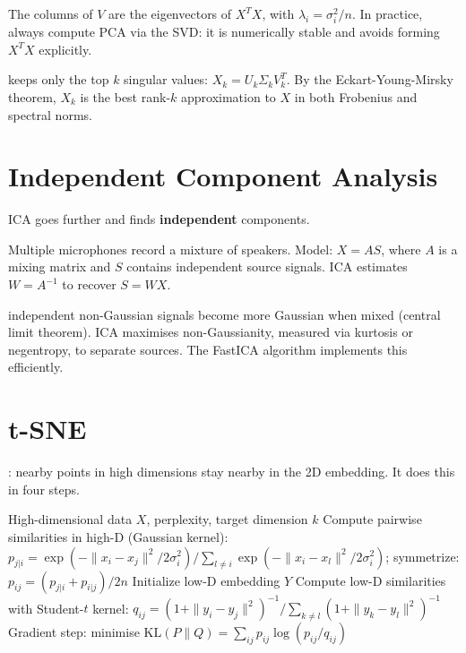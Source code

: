  The columns of $V$ are the eigenvectors of $X^T X$, with $\lambda_i = \sigma_i^2 / n$.
In practice, always compute PCA via the SVD: it is numerically stable and avoids forming $X^T X$ explicitly.

 keeps only the top $k$ singular values: $X_k = U_k \Sigma_k V_k^T$.
By the Eckart-Young-Mirsky theorem, $X_k$ is the best rank-$k$ approximation to $X$ in both Frobenius and spectral norms.


\section{Independent Component Analysis}


ICA goes further and finds \textbf{independent} components.

 Multiple microphones record a mixture of speakers.
Model: $X = AS$, where $A$ is a mixing matrix and $S$ contains independent source signals.
ICA estimates $W{=}A^{-1}$ to recover $S{=}WX$.

 independent non-Gaussian signals become more Gaussian when mixed (central limit theorem).
ICA maximises non-Gaussianity, measured via kurtosis or negentropy, to separate sources.
The FastICA algorithm implements this efficiently.


\section{t-SNE}


: nearby points in high dimensions stay nearby in the 2D embedding.
It does this in four steps.

\begin{algorithm}[H]
\caption{t-SNE}
\begin{algorithmic}[1]
\Require High-dimensional data $X$, perplexity, target dimension $k$
\State Compute pairwise similarities in high-D (Gaussian kernel): $p_{j|i} = \exp(-\|x_i - x_j\|^2 / 2\sigma_i^2) / \sum_{l \neq i} \exp(-\|x_i - x_l\|^2 / 2\sigma_i^2)$; symmetrize: $p_{ij} = (p_{j|i} + p_{i|j}) / 2n$
\State Initialize low-D embedding $Y$
\Repeat
    \State Compute low-D similarities with Student-$t$ kernel: $q_{ij} = (1 + \|y_i - y_j\|^2)^{-1} / \sum_{k \neq l} (1 + \|y_k - y_l\|^2)^{-1}$
    \State Gradient step: minimise $\text{KL}(P \| Q) = \sum_{ij} p_{ij} \log (p_{ij} / q_{ij})$
\end{algorithmic}
\end{algorithm}

